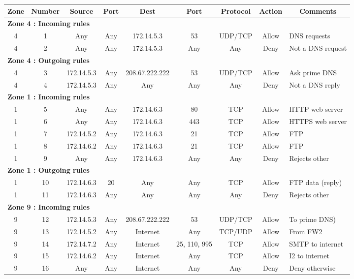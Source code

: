 \documentclass[a4paper,titlepage]{article}
\begin{document}
\begin{table}[h]
	\center
	\begin{tabular}{c|c|cc|cc|ccl}
		Zone & Number & Source & Port & Dest & Port & Protocol & Action & \multicolumn{1}{c}{Comments}\\

		\hline
		\multicolumn{9}{l}{\textbf{Zone 4 : Incoming rules}}\\
		4 & 1 & Any & Any & 172.14.5.3 & 53 & UDP/TCP & Allow & DNS requests\\
		4 & 2 & Any & Any & 172.14.5.3 & Any & Any & Deny & Not a DNS request\\

		\hline
		\multicolumn{9}{l}{\textbf{Zone 4 : Outgoing rules}}\\
		4 & 3 & 172.14.5.3 & Any & 208.67.222.222 & 53 & UDP/TCP & Allow & Ask prime DNS\\
		4 & 4 & 172.14.5.3 & Any & Any & Any & Any & Deny & Not a DNS reply\\

		\hline
		\multicolumn{9}{l}{\textbf{Zone 1 : Incoming rules}}\\
		1 & 5 & Any & Any & 172.14.6.3 & 80 & TCP & Allow & HTTP web server\\
		1 & 6 & Any & Any & 172.14.6.3 & 443 & TCP & Allow & HTTPS web server\\
		1 & 7 & 172.14.5.2 & Any & 172.14.6.3 & 21 & TCP & Allow & FTP\\
		1 & 8 & 172.14.6.2 & Any & 172.14.6.3 & 21 & TCP & Allow & FTP\\
		1 & 9 & Any & Any & 172.14.6.3 & Any & Any & Deny & Rejects other\\

		\hline
		\multicolumn{9}{l}{\textbf{Zone 1 : Outgoing rules}}\\
		1 & 10 & 172.14.6.3 & 20 & Any & Any & TCP & Allow & FTP data (reply)\\
		1 & 11 & 172.14.6.3 & Any & Any & Any & Any & Deny & Rejects other\\

		\hline
		\multicolumn{9}{l}{\textbf{Zone 9 : Incoming rules}}\\
		9 & 12 & 172.14.5.3 & Any & 208.67.222.222 & 53 & UDP/TCP & Allow & To prime DNS)\\
		9 & 13 & 172.14.5.2 & Any & Internet & Any & TCP/UDP & Allow & From FW2\\
		9 & 14 & 172.14.7.2 & Any & Internet & 25, 110, 995 & TCP & Allow & SMTP to internet\\
		9 & 15 & 172.14.6.2 & Any & Internet & Any & TCP & Allow & I2 to internet\\
		9 & 16 & Any & Any & Internet & Any & Any & Deny & Deny otherwise\\


\end{tabular}
\end{table}
\end{document}
